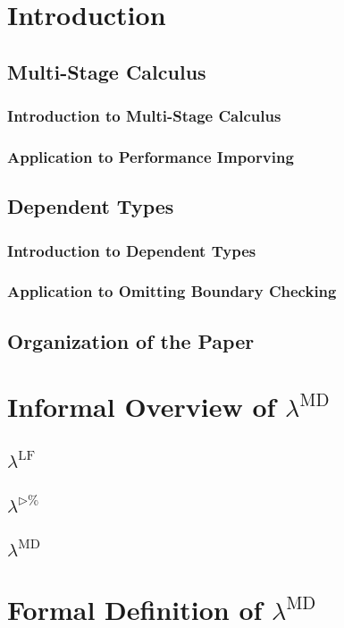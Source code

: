 \documentclass[runningheads]{llncs}
\newcommand{\LTP}{$\lambda^{\triangleright\%}$}
\newcommand{\LMD}{$\lambda^{\textrm{MD}}$}
\newcommand{\LLF}{$\lambda^{\textrm{LF}}$}
\begin{document}
\section{Introduction}
\subsection{Multi-Stage Calculus}
\subsubsection{Introduction to Multi-Stage Calculus}
\subsubsection{Application to Performance Imporving}
\subsection{Dependent Types}
\subsubsection{Introduction to Dependent Types}
\subsubsection{Application to Omitting Boundary Checking}
\subsection{Organization of the Paper}

\section{Informal Overview of \LMD}
\subsection{\LLF}
\subsection{\LTP}
\subsection{\LMD}

\section{Formal Definition of \LMD}
\end{document}
